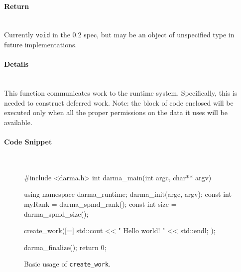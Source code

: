\paragraph{Return}\mbox{}\\
Currently \texttt{void} in the 0.2 spec, but may be an object of unspecified
type in future implementations.

\paragraph{Details}\mbox{}\\
This function communicates work to the runtime system. 
Specifically, this is needed to construct deferred work. 
Note: the block of code enclosed will be executed only when all the 
proper permissions on the data it uses will be available.


\paragraph{Code Snippet}\mbox{}\\
\begin{figure}[!h]
\begin{CppCodeNumb}
#include <darma.h>
int darma_main(int argc, char** argv)
{
  using namespace darma_runtime;
  darma_init(argc, argv);
  const int myRank = darma_spmd_rank();
  const int size = darma_spmd_size();

  create_work([=]
  {
  	std::cout << " Hello world! " << std::endl;
  });

  darma_finalize();
  return 0;
}
\end{CppCodeNumb}
\label{fig:fe_api_cw}
\caption{Basic usage of \texttt{create\_work}.}
\end{figure}


